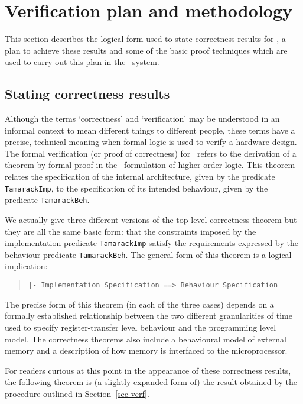 \section{Verification plan and methodology}
\label{sec-plan}

This section describes the logical form used to
state correctness results for \Tamarack,
a plan to achieve these results and
some of the basic proof techniques which are used to
carry out this plan in the \HOL\ system.

\subsection{Stating correctness results}

Although
the terms `correctness' and `verification' may be understood
in an informal context to mean
different things to different people,
these terms have a precise, technical meaning when formal logic
is used to verify a hardware design.
The formal verification (or proof of correctness) for \Tamarack\
refers to the derivation of a theorem by formal proof in
the \HOL\ formulation of higher-order logic.
This theorem
relates the specification of the internal architecture, given
by the predicate \verb"TamarackImp", to the specification of
its intended behaviour, given by the predicate \verb"TamarackBeh".

We actually give three different versions of the top level
correctness theorem but they are all the same basic form:
that the constraints imposed by the implementation predicate
\verb"TamarackImp" satisfy the requirements expressed by
the behaviour predicate \verb"TamarackBeh".
The general form of this theorem is a logical implication:

\begin{quote}
\verb"|- Implementation Specification ==> Behaviour Specification"
\end{quote}

The precise form of this theorem (in each of the three cases)
depends on a formally established relationship between the
two different granularities of time used to specify
register-transfer level behaviour and the programming level model.
The correctness theorems also include a behavioural model of
external memory and a description of how memory is interfaced
to the microprocessor.

For readers curious at this point
in the appearance of these correctness results,
the following theorem
is (a slightly expanded form of) the result obtained
by the procedure outlined in Section~\ref{sec-verf}.


